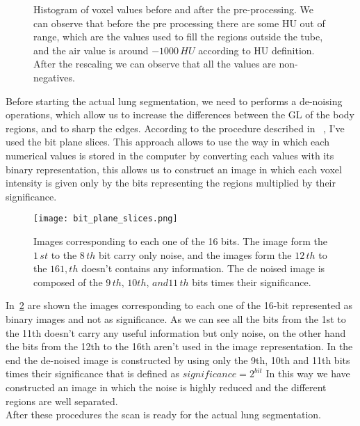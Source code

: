 \documentclass{standalone}
\begin{document}
	\begin{figure}[h]
		\centering
		\label{fig:Pre-Processing}\caption{Histogram of voxel values before and after the pre-processing. We can observe that before the pre processing there are some HU out of range, which are the values used to fill the regions outside the tube, and the air value is around $-1000\,HU$ according to HU definition. After the rescaling we can observe that all the values are non-negatives.}
	\end{figure}
	
	
	
	Before starting the actual lung segmentation, we need to performs a de-noising operations, which allow us to increase the differences between the GL of the body regions, and to sharp the edges. According to the procedure described in ~\cite{ART:Abdullah}, I've used the bit plane slices. This approach allows to use the way in which each numerical values is stored in the computer by converting  each values with its binary representation, this allows us to construct an image in which each voxel intensity is given only by the bits representing the regions multiplied by their significance.
	
	\begin{figure}[h]
		\centering
			\texttt{[image: bit\_plane\_slices.png]}
		\label{fig:BinaryRepr}\caption{Images corresponding to each one of the 16 bits. The image form the $1\,st$ to the $8\,th $ bit carry only noise, and the images form the $12\,th$ to the $161,th$ doesn't  contains any information. The de noised image is composed of the $9\,th,\,10th,\,and 11\,th$ bits times their significance. }
	\end{figure}

	In \figurename\,\ref{fig:BinaryRepr} are shown the images corresponding to each one of the 16-bit represented as binary images and not as significance. As we can see all the bits from the 1st to the 11th doesn't carry any useful information but only noise, on the other hand the bits from the 12th to the 16th aren't used in the image representation. In the end the de-noised image is constructed by using only the 9th, 10th and 11th bits times their significance that is defined as $significance = 2^{bit}$
	In this way we have constructed an image in which the noise is highly reduced and the different regions are well separated.\\
	After these procedures the scan is ready for the actual lung segmentation.
	
\end{document}
